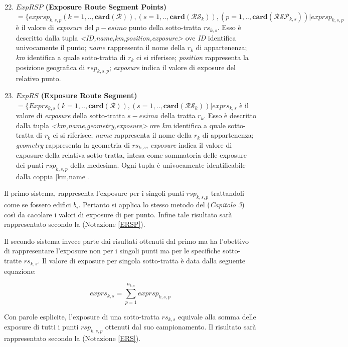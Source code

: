 \begin{enumerate}
\setcounter{enumi}{21}
\item \label{ERSP} \textbf{$ExpRSP$ (Exposure Route Segment Points)} $ = \{exprsp_{k,s,p} (k=1,..,\mathbf{card}(\mathcal{R})),(s=1,..,\mathbf{card}(\mathcal{RS}_k)),(p=1,..,\mathbf{card}(\mathcal{RSP}_{k,s}))  | exprsp_{k,s,p} $ è il valore di \textit{exposure} del $p-esimo$ punto della sotto-tratta $rs_{k,s}$. Esso è descritto dalla tupla \textit{<ID,name,km,position,exposure>} ove \textit{ID} identifica univocamente il punto; \textit{name} rappresenta il nome della $r_k$ di appartenenza; \textit{km} identifica a quale sotto-tratta di $r_k$ ci si riferisce; \textit{position} rappresenta la posizione geografica di $rsp_{k,s,p}$; \textit{exposure} indica il valore di exposure del relativo punto.

\item \label{ERS} \textbf{$ExpRS$ (Exposure Route Segment)} $ = \{Exprs_{k,s} (k=1,..,\mathbf{card}(\mathcal{R})),(s=1,..,\mathbf{card}(\mathcal{RS}_k)) | exprs_{k,s} $ è il valore di \textit{exposure} della sotto-tratta $s-esima$ della tratta $r_k$. Esso è descritto dalla tupla \textit{<km,name,geometry,exposure>} ove \textit{km} identifica a quale sotto-tratta di $r_k$ ci si riferisce; \textit{name} rappresenta il nome della $r_k$ di appartenenza; \textit{geometry} rappresenta la geometria di $rs_{k,s}$, \textit{exposure} indica il valore di exposure della relativa sotto-tratta, intesa come sommatoria delle exposure dei punti $rsp_{k,s,p}$ della medesima. Ogni tupla è univocamente identificabile dalla coppia [km,name].

\end{enumerate}

Il primo sistema, rappresenta l'exposure per i singoli punti $rsp_{k,s,p}$ trattandoli come se fossero edifici $b_i$. Pertanto si applica lo stesso metodo del (\textit{Capitolo 3}) così da cacolare i valori di exposure di per punto. Infine tale risultato sarà rappresentato secondo la (Notazione \ref{ERSP}).

Il secondo sistema invece parte dai risultati ottenuti dal primo ma ha l'obettivo di rappresentare l'exposure non per i singoli punti ma per le specifiche sotto-tratte $rs_{k,s}$. Il valore di exposure per singola sotto-tratta è data dalla seguente equazione:

\begin{equation}\label{eq:exprs}
exprs_{k,s}=\sum_{p=1}^{n_{k,s}} exprsp_{k,s,p}
\end{equation}

Con parole esplicite, l'exposure di una sotto-tratta $rs_{k,s}$ equivale alla somma delle exposure di tutti i punti $rsp_{k,s,p}$ ottenuti dal suo campionamento. Il risultato sarà rappresentato secondo la (Notazione \ref{ERS}).